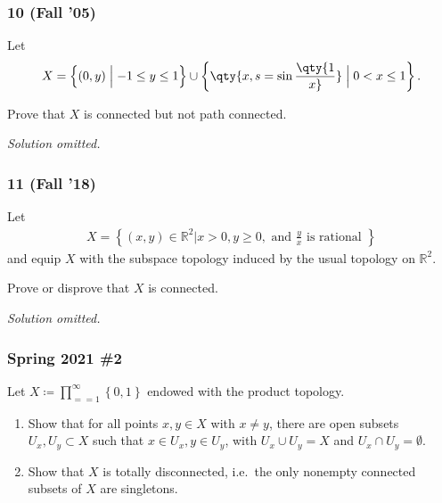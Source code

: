 \hypertarget{fall-05-1}{%
\subsubsection{10 (Fall '05)}\label{fall-05-1}}

\begin{problem}[?]

Let
\begin{align*}
X = \left\{{(0, y) \mathrel{\Big|}- 1 \leq y \leq 1}\right\} \cup \left\{{\qty{x, s = \sin\qty{1 \over x}} \mathrel{\Big|}0 < x \leq 1}\right\}
.\end{align*}

Prove that \(X\) is connected but not path connected.

\end{problem}

\emph{Solution omitted.}

\hypertarget{fall-18-1}{%
\subsubsection{11 (Fall '18)}\label{fall-18-1}}

\begin{problem}[?]

Let
\begin{align*} X=\left\{(x, y) \in \mathbb{R}^{2} | x>0, y \geq 0, \text { and } \frac{y}{x} \text { is rational }\right\} \end{align*}
and equip \(X\) with the subspace topology induced by the usual topology
on \({\mathbb{R}}^2\).

Prove or disprove that \(X\) is connected.

\end{problem}


\emph{Solution omitted.}

\hypertarget{spring-2021-2}{%
\subsubsection{Spring 2021 \#2}\label{spring-2021-2}}

\begin{problem}[Spring 2021, 2]

Let \(X \coloneqq\prod_{==1}^{\infty} \left\{{ 0, 1 }\right\}\) endowed
with the product topology.

\begin{enumerate}
\def\labelenumi{\alph{enumi}.}
\item
  Show that for all points \(x,y\in X\) with \(x\neq y\), there are open
  subsets \(U_x, U_y \subset X\) such that \(x\in U_x, y\in U_y\), with
  \(U_x \cup U_y = X\) and \(U_x \cap U_y = \emptyset\).
\item
  Show that \(X\) is totally disconnected, i.e.~the only nonempty
  connected subsets of \(X\) are singletons.
\end{enumerate}

\end{problem}

